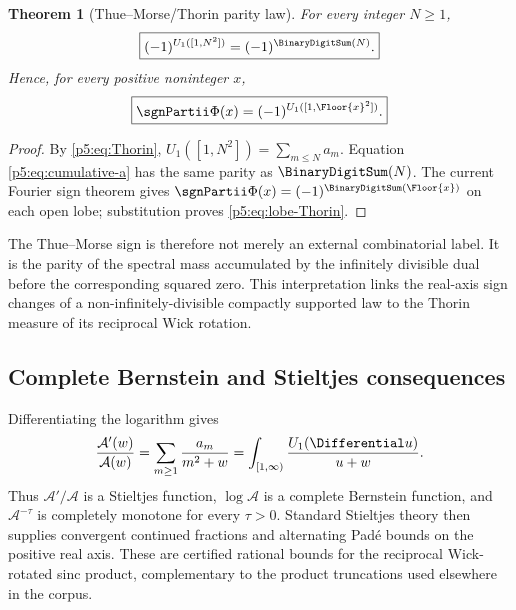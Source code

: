 \documentclass[11pt]{article}
\numberwithin{equation}{section}
\newtheorem{theorem}{Theorem}[section]
\theoremstyle{definition}
\theoremstyle{remark}
\begin{document}
\begin{theorem}[Thue--Morse/Thorin parity law]\label{p5:thm:Thorin-parity}
For every integer $N\ge1$,
\begin{equation}\label{p5:eq:Thorin-parity}
 \boxed{
 (-1)^{U_1([1,N^2])}=(-1)^{\BinaryDigitSum(N)}.}
\end{equation}
Hence, for every positive noninteger $x$,
\begin{equation}\label{p5:eq:lobe-Thorin}
 \boxed{
 \sgnPartii\Phi(x)=(-1)^{U_1([1,\Floor{x}^2])}.}
\end{equation}
\end{theorem}

\begin{proof}
By \cref{p5:eq:Thorin}, $U_1([1,N^2])=\sum_{m\le N}a_m$.
Equation \cref{p5:eq:cumulative-a} has the same parity as $\BinaryDigitSum(N)$.  The current
Fourier sign theorem gives
$\sgnPartii\Phi(x)=(-1)^{\BinaryDigitSum(\Floor{x})}$ on each open lobe; substitution
proves \cref{p5:eq:lobe-Thorin}.
\end{proof}

\begin{remark}
The Thue--Morse sign is therefore not merely an external combinatorial label.
It is the parity of the spectral mass accumulated by the infinitely divisible
dual before the corresponding squared zero.  This interpretation links the
real-axis sign changes of a non-infinitely-divisible compactly supported law to
the Thorin measure of its reciprocal Wick rotation.
\end{remark}

\subsection{Complete Bernstein and Stieltjes consequences}

Differentiating the logarithm gives
\begin{equation}\label{p5:eq:Stieltjes-logderivative}
 \frac{\mathcal A'(w)}{\mathcal A(w)}
 =\sum_{m\ge1}\frac{a_m}{m^2+w}
 =\int_{[1,\infty)}\frac{U_1(\Differential u)}{u+w}.
\end{equation}
Thus $\mathcal A'/\mathcal A$ is a Stieltjes function,
$\log\mathcal A$ is a complete Bernstein function, and
$\mathcal A^{-\tau}$ is completely monotone for every $\tau>0$.  Standard
Stieltjes theory then supplies convergent continued fractions and alternating
Pad\'e bounds on the positive real axis.  These are certified rational bounds
for the reciprocal Wick-rotated sinc product, complementary to the product
truncations used elsewhere in the corpus.
\end{document}
